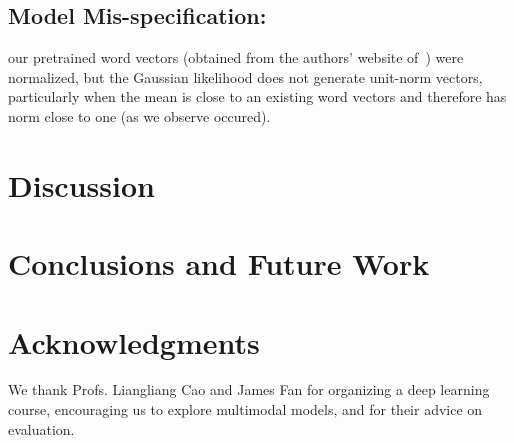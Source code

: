 \documentclass[11pt]{article}
\begin{document}
\subsection{Model Mis-specification:}
\label{sec:misspec}
our pretrained word vectors (obtained from the authors' website of~\cite{Mikolov13a}) were normalized, but the Gaussian likelihood does not generate unit-norm vectors, particularly when the mean is close to an existing word vectors and therefore has norm close to one (as we observe occured). 

\section{Discussion}

\section{Conclusions and Future Work}

\section*{Acknowledgments}

We thank Profs. Liangliang Cao and James Fan for organizing a deep learning course, encouraging us to explore multimodal models, and for their advice on evaluation.




\end{document}
